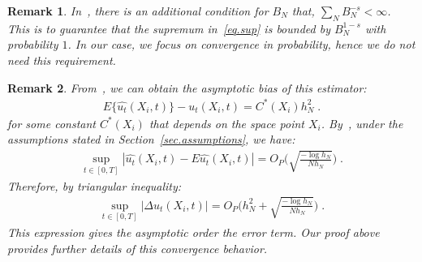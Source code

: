 \documentclass[a4paper,11pt]{article}
\newtheorem{remark}{Remark}[section]
\begin{document}
\begin{remark}
In~\cite{mack1982weak}, there is an additional condition for $B_N$ that, $\sum_{N}B_N^{-s}<\infty$. This is to guarantee that the supremum in~\eqref{eq.sup} is bounded by $B_N^{1-s}$ with probability $1$. In our case, we focus on convergence in probability, hence we do not need this requirement.
\end{remark}
\begin{remark}
From~\cite{fan1997local}, we can obtain the asymptotic bias of this estimator:
\begin{align}
	E\{\widehat{u_t}(X_i,t)\}- u_t(X_i,t)=C^*(X_i)h_N^{2}\;.
\end{align}
for some constant $C^*(X_i)$ that depends on the space point $X_i$. By~\cite{mack1982weak,tusnady1977remark}, under the assumptions stated in Section~\ref{sec.assumptions}, we have:
\begin{align}
\sup_{t\in[0,T]}|\widehat{u_t}(X_i,t)-E\widehat{u_t}(X_i,t)|	=O_P\Big(\sqrt{\frac{-\log h_N}{Nh_N}}\Big)\;.
\end{align}
Therefore, by triangular inequality:
\begin{align}
\sup_{t\in[0,T]}|\Delta u_t(X_i,t)|=	O_P\Big(h_N^2+\sqrt{\frac{-\log h_N}{Nh_N}}\Big)\;.
\end{align}
This expression gives the asymptotic order the error term. Our proof above provides further details of this convergence behavior. 
\end{remark}
\end{document}
